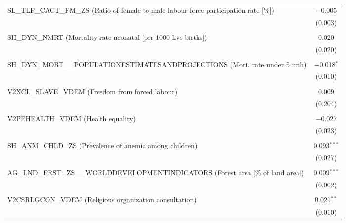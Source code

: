 \documentclass[a4paper]{article}
\begin{document}
\begin{table}[!htbp]
\begin{tabular}{@{\extracolsep{5pt}}lc}
 SL\_TLF\_CACT\_FM\_ZS (Ratio of female to male labour force participation rate [\%]) & $-$0.005 \\

  & (0.003) \\

  & \\

 SH\_DYN\_NMRT (Mortality rate neonatal [per 1000 live births]) & 0.020 \\

  & (0.020) \\

  & \\

 SH\_DYN\_MORT\_\_POPULATIONESTIMATESANDPROJECTIONS (Mort. rate under 5 mth) & $-$0.018$^{*}$ \\

  & (0.010) \\

  & \\

 V2XCL\_SLAVE\_VDEM (Freedom from forced labour) & 0.009 \\

  & (0.204) \\

  & \\

 V2PEHEALTH\_VDEM (Health equality) & $-$0.027 \\

  & (0.023) \\

  & \\

 SH\_ANM\_CHLD\_ZS (Prevalence of anemia among children) & 0.093$^{***}$ \\

  & (0.027) \\

  & \\

 AG\_LND\_FRST\_ZS\_\_WORLDDEVELOPMENTINDICATORS (Forest area [\% of land area]) & 0.009$^{***}$ \\

  & (0.002) \\

  & \\

 V2CSRLGCON\_VDEM (Religious organization consultation) & 0.021$^{**}$ \\

  & (0.010) \\


\end{tabular}
\end{table}
\end{document}
